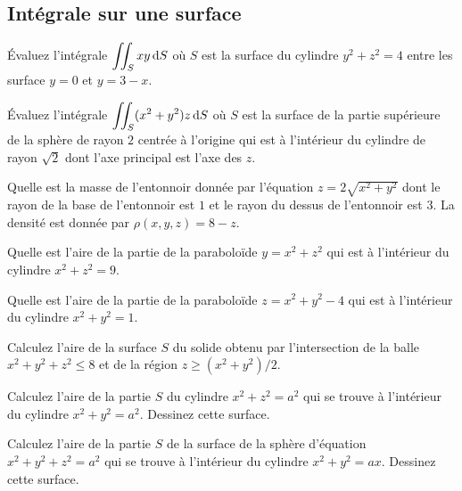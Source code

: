 \subsection{Intégrale sur une surface}

\begin{question}
Évaluez l'intégrale $\displaystyle \iint_S xy \,\mathrm{d}S$ où $S$
est la surface du cylindre $y^2 + z^2 = 4$ entre les surface $y=0$ et
$y = 3 - x$.
\label{17Q9}
\end{question}

\begin{question}
Évaluez l'intégrale $\displaystyle \iint_S (x^2+y^2)z \,\mathrm{d}S$ où $S$
est la surface de la partie supérieure de la sphère de rayon $2$
centrée à l'origine qui est à l'intérieur du cylindre de rayon
$\sqrt{2}$ dont l'axe principal est l'axe des $z$.
\label{17Q10}
\end{question}

\begin{question}
Quelle est la masse de l'entonnoir donnée par l'équation
$z = 2 \sqrt{x^2+y^2}$ dont le rayon de la base de l'entonnoir est $1$
et le rayon du dessus de l'entonnoir est $3$.  La densité est donnée
par $\rho(x,y,z) = 8 - z$.
\label{17Q11}
\end{question}

\begin{question}
Quelle est l'aire de la partie de la paraboloïde $y = x^2 + z^2$ qui
est à l'intérieur du cylindre $x^2 + z^2 = 9$.
\label{17Q12}
\end{question}

\begin{question}
Quelle est l'aire de la partie de la paraboloïde $z = x^2 + y^2 - 4$ qui
est à l'intérieur du cylindre $x^2 + y^2 = 1$.
\label{17Q13}
\end{question}

\begin{question}
Calculez l'aire de la surface $S$ du solide obtenu par l'intersection de
la balle $x^2 + y^2 + z^2 \leq 8$ et de la région $z \geq (x^2 + y^2)/2$.
\label{17Q14}
\end{question}

\begin{question}
Calculez l'aire de la partie $S$ du cylindre $x^2 + z^2 = a^2$ qui se
trouve à l'intérieur du cylindre $x^2 + y^2 = a^2$.  Dessinez cette
surface.
\label{17Q15}
\end{question}

\begin{question}
Calculez l'aire de la partie $S$ de la surface de la sphère d'équation
$x^2 + y^2 + z^2 = a^2$ qui se trouve à l'intérieur du cylindre
$x^2 + y^2 = ax$.  Dessinez cette surface.
\label{17Q16}
\end{question}

